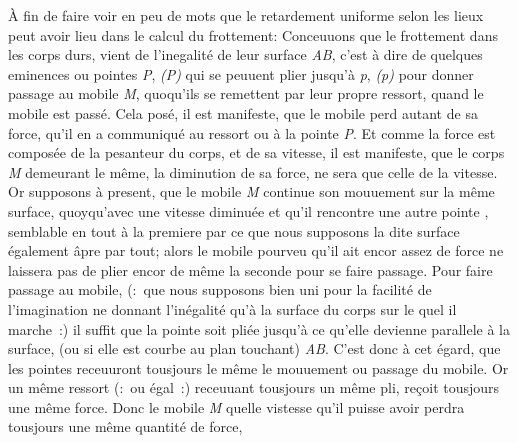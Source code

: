\vspace*{8mm}
\pstart 
\normalsize
\noindent
[127~r\textsuperscript{o}] \`{A} fin de faire voir en peu de mots que le retardement uniforme selon les lieux peut avoir lieu dans le calcul du frottement: Conceuuons que le frottement dans les corps durs, vient de l'inegalit\'{e} de leur surface \textit{AB}, c'est \`{a} dire de quelques eminences ou pointes \textit{P}, \textit{(P)} qui se peuuent plier jusqu'\`{a} \textit{p}, \textit{(p)} pour donner passage au mobile \textit{M}, quoqu'ils se remettent par leur propre ressort, quand le mobile est pass\'{e}.
\pend
\count{}
\count{}
\count{}
\pstart
Cela pos\'{e}, il est manifeste, que le mobile perd autant de sa force, qu'il en a communiqu\'{e} au ressort ou \`{a} la pointe \textit{P}. Et comme la force est compos\'{e}e de la pesanteur du corps, et de sa vitesse, il est manifeste, que le corps \textit{M} demeurant le m\^{e}me, la diminution de sa force, ne sera que celle de la vitesse.
\pend
\pstart
Or supposons \`{a} present, que le mobile \textit{M} continue son mouuement sur la m\^{e}me surface, quoyqu'avec une vitesse diminu\'{e}e et qu'il rencontre une autre pointe , semblable en tout \`{a} la premiere par ce que nous supposons la dite surface \'{e}galement \^{a}pre par tout; alors le mobile pourveu qu'il ait encor assez de force ne laissera pas de plier encor de m\^{e}me la seconde  pour se faire passage.
\pend
\pstart
Pour faire passage au mobile, (:~que nous supposons bien uni pour la facilit\'{e} de l'imagination ne donnant l'in\'{e}galit\'{e} qu'\`{a} la surface du corps sur le quel il marche~:) il suffit que la pointe  soit pli\'{e}e jusqu'\`{a} ce qu'elle devienne parallele \`{a} la surface, (ou si elle est courbe au plan touchant) \textit{AB}.
\pend
\newpage
\pstart
C'est donc \`{a} cet \'{e}gard, que les pointes receuuront tousjours le m\^{e}me  le mouuement ou passage du mobile. Or un m\^{e}me ressort (:~ou \'{e}gal~:) receuuant tousjours un m\^{e}me pli, re\c{c}oit tousjours une m\^{e}me force. Donc le mobile \textit{M} quelle vistesse qu'il puisse avoir perdra tousjours une m\^{e}me quantit\'{e} de force,%